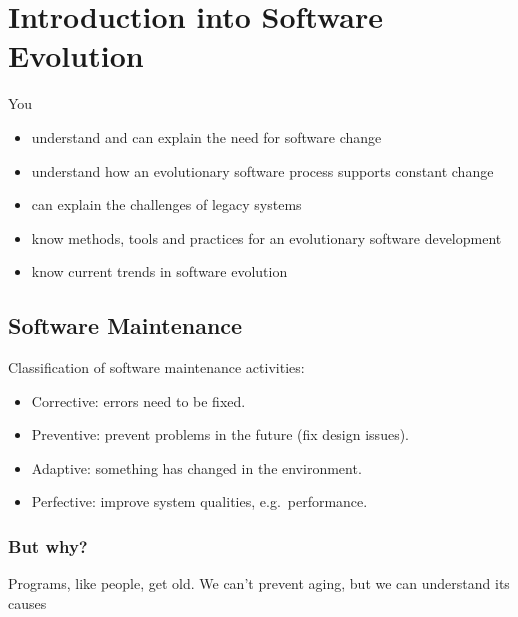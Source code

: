 \hypertarget{introduction-into-software-evolution}{%
\section{Introduction into Software
Evolution}\label{introduction-into-software-evolution}}

\begin{tcolorbox}[colback=blue!5!white,colframe=blue!75!black]
You
\begin{itemize}
\tightlist
\item
  understand and can explain the need for software change
\item
  understand how an evolutionary software process supports constant
  change
\item
  can explain the challenges of legacy systems
\item
  know methods, tools and practices for an evolutionary software
  development
\item
  know current trends in software evolution
\end{itemize}
\end{tcolorbox}

\hypertarget{software-maintenance}{%
\subsection{Software Maintenance}\label{software-maintenance}}

Classification of software maintenance activities:

\begin{itemize}
\tightlist
\item
  Corrective: errors need to be fixed.
\item
  Preventive: prevent problems in the future (fix design issues).
\item
  Adaptive: something has changed in the environment.
\item
  Perfective: improve system qualities, e.g.~performance.
\end{itemize}

\hypertarget{but-why}{%
\subsubsection{But why?}\label{but-why}}

\begin{tcolorbox}[colback=red!5!white,colframe=red!75!black]
Programs, like people, get old. We can’t prevent aging, but we can understand its causes
\end{tcolorbox}


